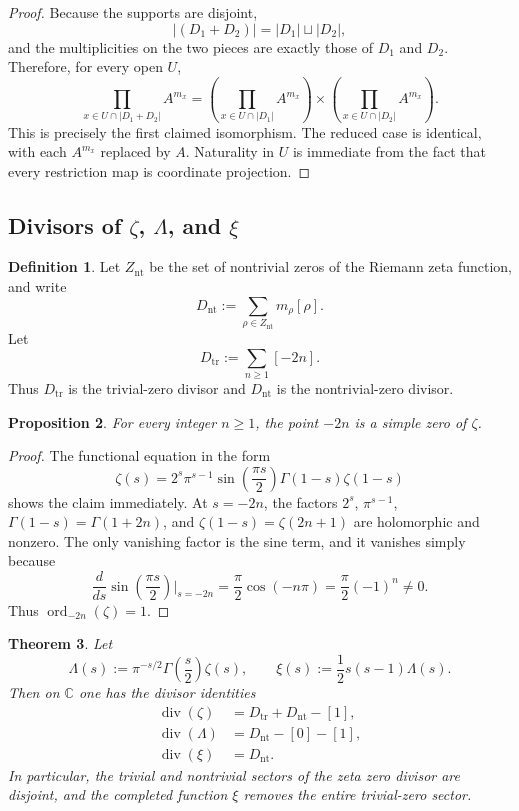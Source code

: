 \documentclass[11pt,a4paper]{article}
\newtheorem{theorem}{Theorem}[section]
\newtheorem{proposition}[theorem]{Proposition}
\theoremstyle{definition}
\newtheorem{definition}[theorem]{Definition}
\theoremstyle{remark}
\newcommand{\CC}{\mathbb C}
\newcommand{\ord}{\operatorname{ord}}
\newcommand{\divv}{\operatorname{div}}
\begin{document}
\begin{proof}
Because the supports are disjoint,
\[
|(D_1+D_2)|=|D_1|\sqcup |D_2|,
\]
and the multiplicities on the two pieces are exactly those of $D_1$ and $D_2$.  Therefore, for every open $U$,
\[
\prod_{x\in U\cap |D_1+D_2|} A^{m_x}
=
\left(\prod_{x\in U\cap |D_1|} A^{m_x}\right)
\times
\left(\prod_{x\in U\cap |D_2|} A^{m_x}\right).
\]
This is precisely the first claimed isomorphism.  The reduced case is identical, with each $A^{m_x}$ replaced by $A$.  Naturality in $U$ is immediate from the fact that every restriction map is coordinate projection.
\end{proof}

\subsection{Divisors of $\zeta$, $\Lambda$, and $\xi$}

\begin{definition}
Let $Z_{\mathrm{nt}}$ be the set of nontrivial zeros of the Riemann zeta function, and write
\[
D_{\mathrm{nt}}:=\sum_{\rho\in Z_{\mathrm{nt}}} m_\rho[\rho].
\]
Let
\[
D_{\mathrm{tr}}:=\sum_{n\ge 1}[-2n].
\]
Thus $D_{\mathrm{tr}}$ is the trivial-zero divisor and $D_{\mathrm{nt}}$ is the nontrivial-zero divisor.
\end{definition}

\begin{proposition}\label{prop:trivial-zeros-simple-again}
For every integer $n\ge 1$, the point $-2n$ is a simple zero of $\zeta$.
\end{proposition}

\begin{proof}
The functional equation in the form
\begin{equation}\label{eq:functional-zeta}
\zeta(s)=2^s\pi^{s-1}\sin\!\left(\frac{\pi s}{2}\right)\Gamma(1-s)\zeta(1-s)
\end{equation}
shows the claim immediately.  At $s=-2n$, the factors $2^s$, $\pi^{s-1}$, $\Gamma(1-s)=\Gamma(1+2n)$, and $\zeta(1-s)=\zeta(2n+1)$ are holomorphic and nonzero.  The only vanishing factor is the sine term, and it vanishes simply because
\[
\frac{d}{ds}\sin\!\left(\frac{\pi s}{2}\right)\Big|_{s=-2n}
=\frac{\pi}{2}\cos(-n\pi)=\frac{\pi}{2}(-1)^n\neq 0.
\]
Thus $\ord_{-2n}(\zeta)=1$.
\end{proof}

\begin{theorem}\label{thm:divisor-identities}
Let
\[
\Lambda(s):=\pi^{-s/2}\Gamma\!\left(\frac{s}{2}\right)\zeta(s),
\qquad
\xi(s):=\frac12 s(s-1)\Lambda(s).
\]
Then on $\CC$ one has the divisor identities
\begin{align*}
\divv(\zeta)&=D_{\mathrm{tr}}+D_{\mathrm{nt}}-[1],\\
\divv(\Lambda)&=D_{\mathrm{nt}}-[0]-[1],\\
\divv(\xi)&=D_{\mathrm{nt}}.
\end{align*}
In particular, the trivial and nontrivial sectors of the zeta zero divisor are disjoint, and the completed function $\xi$ removes the entire trivial-zero sector.
\end{theorem}
\end{document}
